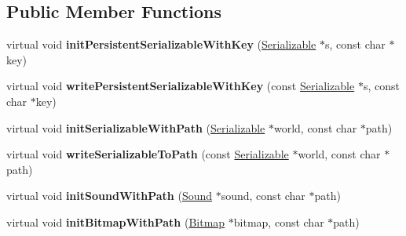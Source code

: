 \subsection*{Public Member Functions}
\begin{DoxyCompactItemize}
\item 
\hypertarget{classg2c_1_1_i_o_s_resource_bank_a32b95b7140db3b44b62c5d006cc2a24c}{
virtual void {\bfseries initPersistentSerializableWithKey} (\hyperlink{classg2c_1_1_serializable}{Serializable} $\ast$s, const char $\ast$key)}
\label{classg2c_1_1_i_o_s_resource_bank_a32b95b7140db3b44b62c5d006cc2a24c}

\item 
\hypertarget{classg2c_1_1_i_o_s_resource_bank_aa451a9ddff750c2fdd3dc7470efb6aac}{
virtual void {\bfseries writePersistentSerializableWithKey} (const \hyperlink{classg2c_1_1_serializable}{Serializable} $\ast$s, const char $\ast$key)}
\label{classg2c_1_1_i_o_s_resource_bank_aa451a9ddff750c2fdd3dc7470efb6aac}

\item 
\hypertarget{classg2c_1_1_i_o_s_resource_bank_a591606485249604a0fe9dda09eb503f0}{
virtual void {\bfseries initSerializableWithPath} (\hyperlink{classg2c_1_1_serializable}{Serializable} $\ast$world, const char $\ast$path)}
\label{classg2c_1_1_i_o_s_resource_bank_a591606485249604a0fe9dda09eb503f0}

\item 
\hypertarget{classg2c_1_1_i_o_s_resource_bank_a4a44fb94323ee11767ec45073bcf4b3f}{
virtual void {\bfseries writeSerializableToPath} (const \hyperlink{classg2c_1_1_serializable}{Serializable} $\ast$world, const char $\ast$path)}
\label{classg2c_1_1_i_o_s_resource_bank_a4a44fb94323ee11767ec45073bcf4b3f}

\item 
\hypertarget{classg2c_1_1_i_o_s_resource_bank_a0dde260f770577f8ec5bfd5244bad8c5}{
virtual void {\bfseries initSoundWithPath} (\hyperlink{classg2c_1_1_sound}{Sound} $\ast$sound, const char $\ast$path)}
\label{classg2c_1_1_i_o_s_resource_bank_a0dde260f770577f8ec5bfd5244bad8c5}

\item 
\hypertarget{classg2c_1_1_i_o_s_resource_bank_a84a7250a86bf2cd643ff5cf7cec52c3e}{
virtual void {\bfseries initBitmapWithPath} (\hyperlink{classg2c_1_1_bitmap}{Bitmap} $\ast$bitmap, const char $\ast$path)}
\label{classg2c_1_1_i_o_s_resource_bank_a84a7250a86bf2cd643ff5cf7cec52c3e}

\end{DoxyCompactItemize}
